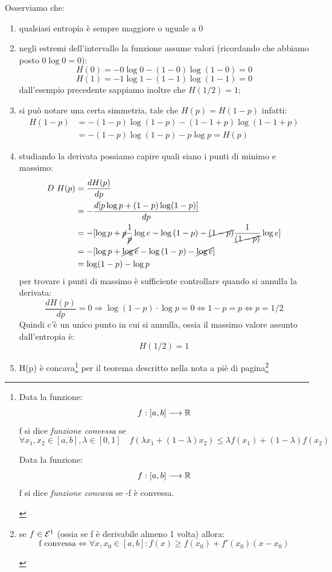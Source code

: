 \noindent
Osserviamo che:
\begin{enumerate}
\item qualsiasi entropia è sempre maggiore o uguale a 0
\item negli estremi dell'intervallo la funzione assume valori (ricordando che abbiamo posto \(0 \log 0 = 0\)):
\[H(0) = - 0 \log{0} -(1-0) \log (1-0) = 0\] 
\[H(1) = - 1 \log{1} -(1-1) \log (1-1) = 0\]
dall'esempio precedente sappiamo inoltre che \(H(1/2) = 1\);
\item si può notare una certa simmetria, tale che \(H(p) = H(1-p)\) infatti:
\[
\begin{split}
H(1-p) &= - (1- p) \log{(1-p)} -(1- 1 + p) \log (1- 1 + p) \\
&= - (1- p) \log{(1-p)} - p \log p = H(p)
\end{split}
\]
\item studiando la derivata possiamo capire quali siano i punti di minimo e massimo:
\[
\begin{split} 
D \ H(p) &= \frac{d H(p)}{d p} \\ 
&= - \frac{d [p \log p + (1-p) \log (1-p)]}{d p} \\ 
&= - [\log p + \cancel{p} \frac{1}{\cancel{p}} \log e - \log{(1-p)} - \cancel{(1-p)} \frac{1}{\cancel{(1-p)}}\log e] \\ 
&= - [\log p +  \cancel{\log e} - \log{(1-p)} - \cancel{\log e}] \\ 
&= \log (1-p) - \log p \\ 
\end{split} 
\]
per trovare i punti di massimo è sufficiente controllare quando si annulla la derivata:
\[\frac{d H(p)}{d p} = 0 \Longrightarrow \log (1-p) \cdot \log p = 0 \iff 1-p = p \iff p = 1/2\]
Quindi c'è un unico punto in cui si annulla, ossia il massimo valore assunto dall'entropia è:
\[H(1/2) = 1\]
\item H(p) è concava\footnote{
\begin{definizione}
Data la funzione:
\[f: [a,b] \longrightarrow \mathbb{R} \]
f si dice \textit{funzione convessa} se
\[\forall x_1, x_2 \in [a,b], \lambda \in [0,1] \quad f(\lambda x_1 + (1-\lambda)x_2) \leq \lambda f(x_1) + (1-\lambda) f(x_2)\]
\end{definizione}

\begin{definizione}
Data la funzione:
\[f: [a,b] \longrightarrow \mathbb{R} \]f si dice \textit{funzione concava} se -f è convessa.
\end{definizione}
} per il teorema descritto nella nota a piè di pagina\footnote{
\begin{teorema}
se \(f \in \mathcal{E}^1\) (ossia se f è derivabile almeno 1 volta) allora:
\[\mbox{f convessa} \iff \forall x, x_0 \in [a,b] : f(x) \geq f(x_0) + f'(x_0) (x-x_0)\]
\label{concava1}
\end{teorema}

}
\end{enumerate}
